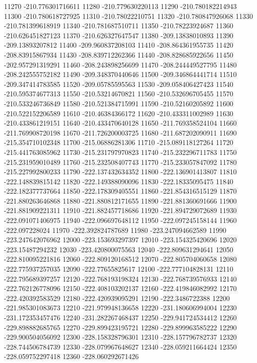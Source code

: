 {11270 -210.776301716611
11280 -210.779630220113
11290 -210.780182214943
11300 -210.780618727925
11310 -210.78022210751
11320 -210.780847926068
11330 -210.781399618919
11340 -210.781687510711
11350 -210.78223924687
11360 -210.626451827123
11370 -210.626327647547
11380 -209.13838010893
11390 -209.13893207812
11400 -209.960837208103
11410 -208.864361955735
11420 -208.83915867934
11430 -208.839712262366
11440 -208.828685922656
11450 -202.957291319291
11460 -208.243898256699
11470 -208.244449527795
11480 -208.242555752182
11490 -209.348370440646
11500 -209.346864441714
11510 -209.347414783585
11520 -209.05785595563
11530 -209.058406427423
11540 -210.595374677313
11550 -210.53214670821
11560 -210.532696705455
11570 -210.533246736849
11580 -210.521384715991
11590 -210.52160205892
11600 -210.522152206589
11610 -210.46384366172
11620 -210.433311002989
11630 -210.433861219151
11640 -210.433470640128
11650 -211.769358524104
11660 -211.769908720198
11670 -211.726200003725
11680 -211.687202090911
11690 -215.354710102348
11700 -215.06886281306
11710 -215.089118127264
11720 -215.441763085962
11730 -215.231797970823
11740 -215.232296711783
11750 -215.231959010489
11760 -215.232508407743
11770 -215.233057847092
11780 -215.227992800233
11790 -222.137432634352
11800 -222.136901413807
11810 -222.148839815142
11820 -222.149388090096
11830 -222.18335095475
11840 -222.182377737664
11850 -222.178309405551
11860 -221.854316515129
11870 -221.880263646868
11880 -221.880812171655
11890 -221.881360691666
11900 -221.881909221311
11910 -221.882457718686
11920 -221.894729072689
11930 -222.091071406975
11940 -222.096697648112
11950 -222.097245158144
11960 -222.097228024
11970 -222.392824787689
11980 -223.247094662589
11990 -223.247642076962
12000 -223.153693297397
12010 -223.154325420696
12020 -223.15487294232
12030 -223.420800075563
12040 -222.809631294641
12050 -222.810095221816
12060 -222.809120168512
12070 -222.805704060658
12080 -222.775937257035
12090 -222.77655825617
12100 -222.777104828131
12110 -222.795689397257
12120 -222.768193198324
12130 -222.768739576933
12140 -222.762126778096
12150 -222.408103202137
12160 -222.419846082992
12170 -222.420392583529
12180 -222.420939095291
12190 -222.3486722388
12200 -221.985301083673
12210 -221.979948136658
12220 -231.180606994004
12230 -231.172353457476
12240 -231.282267468437
12250 -229.941724534412
12260 -229.898882685765
12270 -229.899423195721
12280 -229.899963585222
12290 -229.900504056092
12300 -228.158328796301
12310 -228.157796782737
12320 -228.744506784739
12330 -228.079967648627
12340 -228.059211664424
12350 -228.059752297418
12360 -228.060292671426
}
